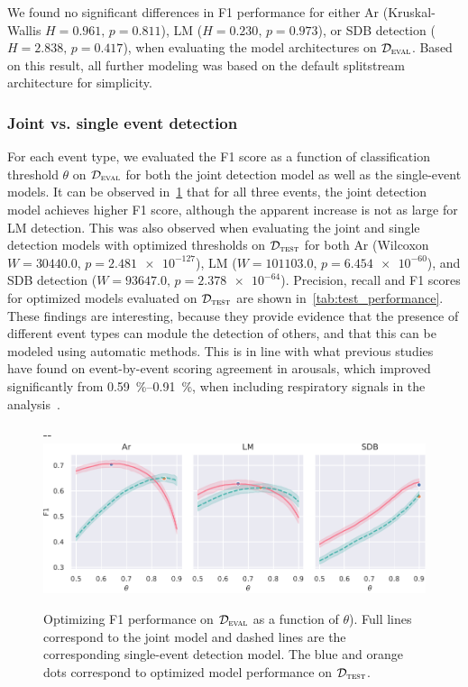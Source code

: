 We found no significant differences in F1 performance for either \ac{Ar} (Kruskal-Wallis \(H = 0.961, \, p = 0.811\)), \ac{LM} (\( H = 0.230, \, p = 0.973 \)), or \ac{SDB} detection (\( H = 2.838, \, p = 0.417 \)), when evaluating the model architectures on \(\mathcal{D}_\textsc{eval}\).
Based on this result, all further modeling was based on the default splitstream architecture for simplicity.


\subsubsection{Joint vs. single event detection}

For each event type, we evaluated the F1 score as a function of classification threshold \(\theta\) on \(\mathcal{D}_\textsc{eval}\) for both the joint detection model as well as the single-event models.
It can be observed in~\cref{fig:f1_theta_eval} that for all three events, the joint detection model achieves higher F1 score, although the apparent increase is not as large for \ac{LM} detection.
This was also observed when evaluating the joint and single detection models with optimized thresholds on \(\mathcal{D}_\textsc{test}\) for both \ac{Ar} (Wilcoxon \(W = 30440.0, \, p = \num{2.481e-127}\)), \ac{LM} (\(W = 101103.0, \, p = \num{6.454e-60}\)), and \ac{SDB} detection (\(W = 93647.0, \, p = \num{2.378e-64}\)). Precision, recall and F1 scores for optimized models evaluated on \(\mathcal{D}_\textsc{test}\) are shown in~\cref{tab:test_performance}.
These findings are interesting, because they provide evidence that the presence of different event types can module the detection of others, and that this can be modeled using automatic methods.
This is in line with what previous studies have found \eg on event-by-event scoring agreement in arousals, which improved significantly from \SIrange{0.59}{0.91}{\percent}, when including respiratory signals in the analysis~\cite{Thomas2003}.

\begin{figure}[tb]
    \centering
    \begin{adjustwidth*}{}{-\marginparwidth-\marginparsep}
    \includegraphics[width=\linewidth]{figures/paper-vi/f1_threshold (1).pdf}
    \caption[Optimizing F1 performance]{Optimizing F1 performance on \(\mathcal{D}_\textsc{eval}\) as a function of \(\theta\)). Full lines correspond to the joint model and dashed lines are the corresponding single-event detection model. The blue and orange dots correspond to optimized model performance on \(\mathcal{D}_\textsc{test}\).}
    \label{fig:f1_theta_eval}
    \end{adjustwidth*}
\end{figure}

